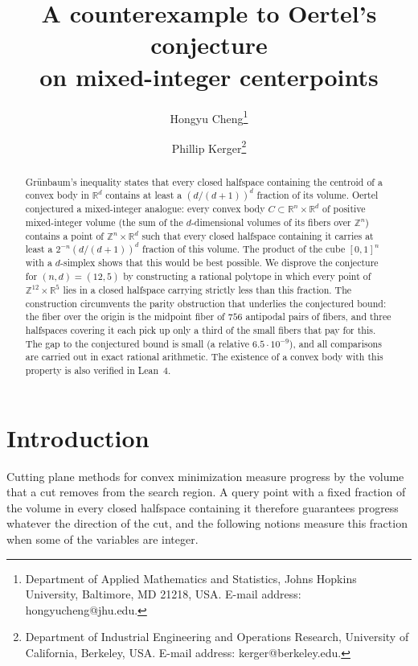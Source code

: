 \documentclass[11pt]{article}
\title{\vspace{-2.5em}A counterexample to Oertel's conjecture\\on mixed-integer centerpoints}
\author{Hongyu Cheng\thanks{Department of Applied Mathematics and Statistics, Johns Hopkins University, Baltimore, MD 21218,
USA. E-mail address: hongyucheng@jhu.edu.}
\and Phillip Kerger\thanks{Department of Industrial Engineering and Operations Research, University of California,
Berkeley, USA. E-mail address: kerger@berkeley.edu.}}
\date{}
\newcommand{\R}{\mathbb{R}}
\newcommand{\Z}{\mathbb{Z}}
\newcommand{\1}{\mathbf{1}}
\begin{document}
\maketitle
\vspace{-2em}

\begin{abstract}
Gr\"unbaum's inequality states that every closed halfspace containing the centroid of a convex body in $\R^d$ contains at
least a $(d/(d+1))^d$ fraction of its volume. Oertel conjectured a mixed-integer analogue: every convex body
$C\subset\R^n\times\R^d$ of positive mixed-integer volume (the sum of the $d$-dimensional volumes of its fibers over $\Z^n$)
contains a point of $\Z^n\times\R^d$ such that every closed halfspace containing it carries at least a
$2^{-n}(d/(d+1))^d$ fraction of this volume. The product of the cube $[0,1]^n$ with a $d$-simplex shows that this would be
best possible. We disprove the conjecture for $(n,d)=(12,5)$ by constructing a rational polytope in which every point of
$\Z^{12}\times\R^5$ lies in a closed halfspace carrying strictly less than this fraction. The construction circumvents the
parity obstruction that underlies the conjectured bound: the fiber over the origin is the midpoint fiber of $756$ antipodal
pairs of fibers, and three halfspaces covering it each pick up only a third of the small fibers that pay for this. The gap
to the conjectured bound is small (a relative $6.5\cdot10^{-9}$), and all comparisons are carried out in exact rational
arithmetic. The existence of a convex body with this property is also verified in Lean~4.
\end{abstract}

\section{Introduction}\label{sec:intro}

Cutting plane methods for convex minimization measure progress by the volume that a cut removes from the search region. A
query point with a fixed fraction of the volume in every closed halfspace containing it therefore guarantees progress
whatever the direction of the cut, and the following notions measure this fraction when some of the variables are integer.
\end{document}
